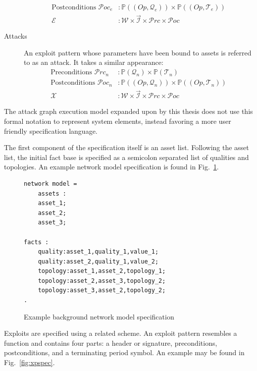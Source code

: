 \begin{description}
\begin{align*}
			\text{Postconditions } \mathcal{P}oc_e&: \mathbb{P}((Op,\mathcal{Q}_e)) \times \mathbb{P}((Op,\mathcal{T}_e)) \\
			\mathcal{E}&: \mathcal{W} \times \vec{\mathcal{I}} \times  \mathcal{P}rc \times \mathcal{P}oc
        \end{align*}
    \item[Attacks] An exploit pattern whose parameters have been bound to assets is referred to as an
		attack. It takes a similar appearance:
		\begin{align*}
			\text{Preconditions } \mathcal{P}rc_n &: \mathbb{P}(\mathcal{Q}_n) \times \mathbb{P}(\mathcal{T}_n) \\
			\text{Postconditions } \mathcal{P}oc_n&: \mathbb{P}((Op,\mathcal{Q}_n)) \times \mathbb{P}((Op,\mathcal{T}_n)) \\
			\mathcal{X}&: \mathcal{W} \times \vec{\mathcal{I}} \times  \mathcal{P}rc \times \mathcal{P}oc
        \end{align*}
\end{description}

The attack graph execution model expanded upon by this thesis does 
not use this formal notation to represent system elements, instead favoring a 
more user friendly specification language. 

The first component of the specification itself is an asset list. Following the
asset list, the initial
fact base is specified as a semicolon separated list of qualities and 
topologies. An example network model specification is found in 
Fig.~\ref{fig:nmspec}.

\begin{figure}
\begin{lstlisting}
network model = 
    assets :
    asset_1;
    asset_2;
    asset_3;

facts :
	quality:asset_1,quality_1,value_1;
	quality:asset_2,quality_1,value_2;
	topology:asset_1,asset_2,topology_1;
	topology:asset_2,asset_3,topology_2;
    topology:asset_3,asset_2,topology_2;
.
\end{lstlisting}
\caption{Example background network model specification}
\label{fig:nmspec}
\end{figure}
Exploits are specified using a related scheme. An exploit pattern resembles a function
and contains four parts: a header or signature, preconditions, postconditions, and a
terminating period symbol. An example may be found in Fig.~\ref{fig:xpspec}.

